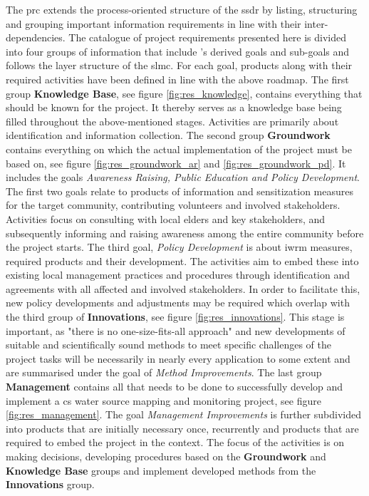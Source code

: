 The \acrfull{prc} extends the process-oriented structure of the \acrshort{ssdr} by listing, structuring and grouping important information requirements in line with their inter-dependencies. The catalogue of project requirements presented here is divided into four groups of information that include \citeauthor{minkmanCitizenScienceWater2015}'s \citeyear{minkmanCitizenScienceWater2015} derived goals and sub-goals and follows the layer structure of the \acrshort{slmc}. For each goal, products along with their required activities have been defined in line with the above roadmap.\newline
The first group \textbf{Knowledge Base}, see figure \ref{fig:res_knowledge}, contains everything that should be known for the project. It thereby serves as a knowledge base being filled throughout the above-mentioned stages. Activities are primarily about identification and information collection. The second group \textbf{Groundwork} contains everything on which the actual implementation of the project must be based on, see figure \ref{fig:res_groundwork_ar} and \ref{fig:res_groundwork_pd}. It includes the goals \textit{Awareness Raising, Public Education and Policy Development}. The first two goals relate to products of information and sensitization measures for the target community, contributing volunteers and involved stakeholders. Activities focus on consulting with local elders and key stakeholders, and subsequently informing and raising awareness among the entire community before the project starts. The third goal, \textit{Policy Development} is about \acrshort{iwrm} measures, required products and their development. The activities aim to embed these into existing local management practices and procedures through identification and agreements with all affected and involved stakeholders. In order to facilitate this, new policy developments and adjustments may be required which overlap with the third group of \textbf{Innovations}, see figure \ref{fig:res_innovations}. This stage is important, as "there is no one-size-fits-all approach" \autocite[2]{fraislCitizenScienceEnvironmental2022} and new developments of suitable and scientifically sound methods to meet specific challenges of the project tasks will be necessarily in nearly every application to some extent and are summarised under the goal of \textit{Method Improvements}. The last group \textbf{Management} contains all that needs to be done to successfully develop and implement a \acrshort{cs} water source mapping and monitoring project, see figure \ref{fig:res_management}. The goal \textit{Management Improvements} is further subdivided into products that are initially necessary once, recurrently and products that are required to embed the project in the context. The focus of the activities is on making decisions, developing procedures based on the \textbf{Groundwork} and \textbf{Knowledge Base} groups and implement developed methods from the \textbf{Innovations} group.\newline
